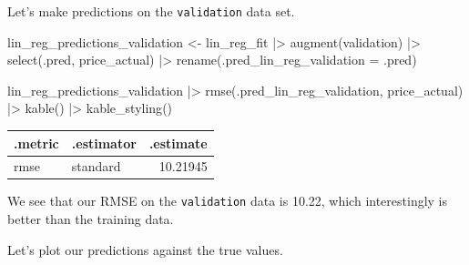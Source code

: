 \documentclass[
]{article}
\newenvironment{Shaded}{\begin{snugshade}}{\end{snugshade}}
\newcommand{\AttributeTok}[1]{\textcolor[rgb]{0.40,0.45,0.13}{#1}}
\newcommand{\FunctionTok}[1]{\textcolor[rgb]{0.28,0.35,0.67}{#1}}
\newcommand{\NormalTok}[1]{\textcolor[rgb]{0.00,0.23,0.31}{#1}}
\newcommand{\OtherTok}[1]{\textcolor[rgb]{0.00,0.23,0.31}{#1}}
\newcommand{\SpecialCharTok}[1]{\textcolor[rgb]{0.37,0.37,0.37}{#1}}
\begin{document}
Let's make predictions on the \texttt{validation} data set.

\begin{Shaded}
\begin{Highlighting}[]
\NormalTok{lin\_reg\_predictions\_validation }\OtherTok{\textless{}{-}}\NormalTok{ lin\_reg\_fit }\SpecialCharTok{|\textgreater{}}
  \FunctionTok{augment}\NormalTok{(validation) }\SpecialCharTok{|\textgreater{}}
  \FunctionTok{select}\NormalTok{(.pred, price\_actual) }\SpecialCharTok{|\textgreater{}}
  \FunctionTok{rename}\NormalTok{(}\AttributeTok{.pred\_lin\_reg\_validation =}\NormalTok{ .pred)}

\NormalTok{lin\_reg\_predictions\_validation }\SpecialCharTok{|\textgreater{}}
  \FunctionTok{rmse}\NormalTok{(.pred\_lin\_reg\_validation, price\_actual) }\SpecialCharTok{|\textgreater{}}
  \FunctionTok{kable}\NormalTok{() }\SpecialCharTok{|\textgreater{}}
  \FunctionTok{kable\_styling}\NormalTok{()}
\end{Highlighting}
\end{Shaded}

\begin{longtable*}[t]{llr}
\toprule
.metric & .estimator & .estimate\\
\midrule
rmse & standard & 10.21945\\
\bottomrule
\end{longtable*}

We see that our RMSE on the \texttt{validation} data is 10.22, which
interestingly is better than the training data.

Let's plot our predictions against the true values.
\end{document}

